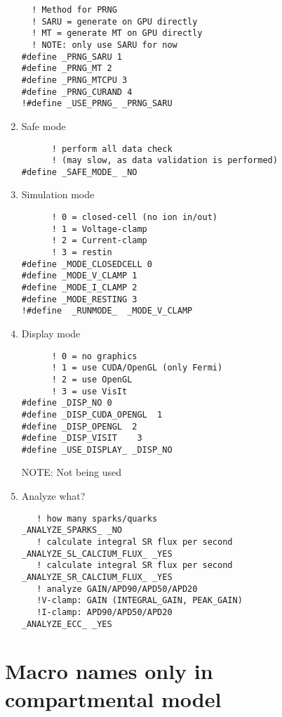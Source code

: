 \begin{enumerate}
\begin{verbatim}
  ! Method for PRNG
  ! SARU = generate on GPU directly
  ! MT = generate MT on GPU directly
  ! NOTE: only use SARU for now 
#define _PRNG_SARU 1
#define _PRNG_MT 2
#define _PRNG_MTCPU 3
#define _PRNG_CURAND 4
!#define _USE_PRNG_ _PRNG_SARU
\end{verbatim}


\item Safe mode
\begin{verbatim}
      ! perform all data check
      ! (may slow, as data validation is performed)
#define _SAFE_MODE_ _NO
\end{verbatim}

\item Simulation mode
\begin{verbatim}
      ! 0 = closed-cell (no ion in/out)
      ! 1 = Voltage-clamp
      ! 2 = Current-clamp
      ! 3 = restin
#define _MODE_CLOSEDCELL 0      
#define _MODE_V_CLAMP 1
#define _MODE_I_CLAMP 2
#define _MODE_RESTING 3      
!#define  _RUNMODE_  _MODE_V_CLAMP
\end{verbatim}


\item Display mode
\begin{verbatim}
      ! 0 = no graphics
      ! 1 = use CUDA/OpenGL (only Fermi)
      ! 2 = use OpenGL
      ! 3 = use VisIt
#define _DISP_NO 0
#define _DISP_CUDA_OPENGL  1
#define _DISP_OPENGL  2
#define _DISP_VISIT    3  
#define _USE_DISPLAY_ _DISP_NO
\end{verbatim}
NOTE: Not being used 

\item Analyze what? 
\begin{verbatim}
   ! how many sparks/quarks
_ANALYZE_SPARKS_ _NO
   ! calculate integral SR flux per second
_ANALYZE_SL_CALCIUM_FLUX_ _YES
   ! calculate integral SR flux per second
_ANALYZE_SR_CALCIUM_FLUX_ _YES
   ! analyze GAIN/APD90/APD50/APD20
   !V-clamp: GAIN (INTEGRAL_GAIN, PEAK_GAIN)
   !I-clamp: APD90/APD50/APD20 
_ANALYZE_ECC_ _YES
\end{verbatim}

\end{enumerate}

\section{Macro names only in compartmental model}


